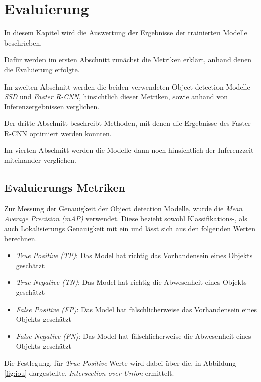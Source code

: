 \chapter{Evaluierung}\label{kap:eval}

In diesem Kapitel wird die Auswertung der 
Ergebnisse der trainierten Modelle beschrieben.

Dafür werden im ersten Abschnitt zunächst die Metriken 
erklärt, anhand denen die Evaluierung erfolgte. 

Im zweiten Abschnitt werden die beiden verwendeten Object detection 
Modelle \textit{SSD} und \textit{Faster R-CNN}, hinsichtlich dieser
Metriken, sowie anhand von Inferenzergebnissen verglichen.

Der dritte Abschnitt beschreibt Methoden, mit denen 
die Ergebnisse des Faster R-CNN optimiert werden konnten.

Im vierten Abschnitt werden die Modelle dann noch hinsichtlich 
der Inferenzzeit miteinander verglichen.


\section{Evaluierungs Metriken}\label{sec:metricen}


Zur Messung der Genauigkeit der Object detection Modelle, 
wurde die \textit{Mean Average Precision (mAP)} verwendet.
Diese bezieht sowohl Klassifikations-, als auch
Lokalisierungs Genauigkeit mit ein und
lässt sich aus den folgenden Werten berechnen.

\begin{itemize}
  \item \textit{True Positive (TP)}:
  Das Model hat richtig das Vorhandensein eines Objekts geschätzt
  \item \textit{True Negative (TN)}:
  Das Model hat richtig die Abwesenheit eines Objekts geschätzt
  \item \textit{False Positive (FP)}:
  Das Model hat fälschlicherweise das Vorhandensein eines Objekts
  geschätzt
  \item \textit{False Negative (FN)}:
  Das Model hat fälschlicherweise die Abwesenheit eines Objekts
  geschätzt
\end{itemize}

Die Festlegung, für \textit{True Positive} Werte wird dabei über die,
in Abbildung \ref{fig:iou} dargestellte,
\textit{Intersection over Union} ermittelt.

